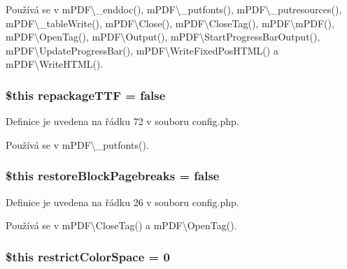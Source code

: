 Používá se v m\-P\-D\-F\textbackslash{}\-\_\-enddoc(), m\-P\-D\-F\textbackslash{}\-\_\-putfonts(), m\-P\-D\-F\textbackslash{}\-\_\-putresources(), m\-P\-D\-F\textbackslash{}\-\_\-table\-Write(), m\-P\-D\-F\textbackslash{}\-Close(), m\-P\-D\-F\textbackslash{}\-Close\-Tag(), m\-P\-D\-F\textbackslash{}m\-P\-D\-F(), m\-P\-D\-F\textbackslash{}\-Open\-Tag(), m\-P\-D\-F\textbackslash{}\-Output(), m\-P\-D\-F\textbackslash{}\-Start\-Progress\-Bar\-Output(), m\-P\-D\-F\textbackslash{}\-Update\-Progress\-Bar(), m\-P\-D\-F\textbackslash{}\-Write\-Fixed\-Pos\-H\-T\-M\-L() a m\-P\-D\-F\textbackslash{}\-Write\-H\-T\-M\-L().

\hypertarget{config_8php_af82c58187010cd8f4c902cb10fa99a90}{
\subsubsection[{repackage\-T\-T\-F}]{\setlength{\rightskip}{0pt plus 5cm}\$this repackage\-T\-T\-F = {\bf false}}}\label{config_8php_af82c58187010cd8f4c902cb10fa99a90}


Definice je uvedena na řádku 72 v souboru config.\-php.



Používá se v m\-P\-D\-F\textbackslash{}\-\_\-putfonts().

\hypertarget{config_8php_a32f3f6af8615f8df0741fff17b4980ff}{
\subsubsection[{restore\-Block\-Pagebreaks}]{\setlength{\rightskip}{0pt plus 5cm}\$this restore\-Block\-Pagebreaks = {\bf false}}}\label{config_8php_a32f3f6af8615f8df0741fff17b4980ff}


Definice je uvedena na řádku 26 v souboru config.\-php.



Používá se v m\-P\-D\-F\textbackslash{}\-Close\-Tag() a m\-P\-D\-F\textbackslash{}\-Open\-Tag().

\hypertarget{config_8php_aa14b0c5efe07e147eee3cf1d8c269c32}{
\subsubsection[{restrict\-Color\-Space}]{\setlength{\rightskip}{0pt plus 5cm}\$this restrict\-Color\-Space = 0}}\label{config_8php_aa14b0c5efe07e147eee3cf1d8c269c32}


